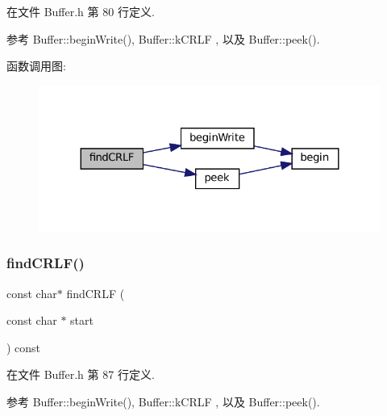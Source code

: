 在文件 Buffer.\+h 第 80 行定义.



参考 Buffer\+::begin\+Write(), Buffer\+::k\+C\+R\+LF , 以及 Buffer\+::peek().

函数调用图\+:
\nopagebreak
\begin{figure}[H]
\begin{center}
\leavevmode
\includegraphics[width=324pt]{classmuduo_1_1net_1_1Buffer_a757db069730494fc47e500b29851c6c5_cgraph}
\end{center}
\end{figure}
\mbox{\label{classmuduo_1_1net_1_1Buffer_ac0c8bd8a269f6d31932e0f7bab608fdf}} 
\subsubsection{\texorpdfstring{find\+C\+R\+L\+F()}{findCRLF()}\hspace{0.1cm}{\footnotesize\ttfamily [2/2]}}
{\footnotesize\ttfamily const char$\ast$ find\+C\+R\+LF (\begin{DoxyParamCaption}\item[{const char $\ast$}]{start }\end{DoxyParamCaption}) const\hspace{0.3cm}{\ttfamily [inline]}}



在文件 Buffer.\+h 第 87 行定义.



参考 Buffer\+::begin\+Write(), Buffer\+::k\+C\+R\+LF , 以及 Buffer\+::peek().

